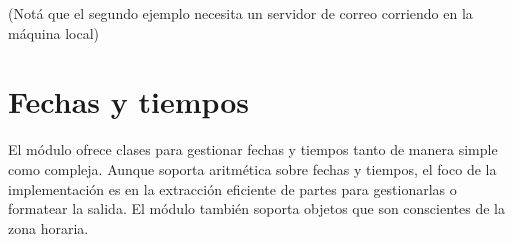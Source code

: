 \documentclass[a4,10pt,spanish]{sphinxmanual}
\begin{document}
\sphinxAtStartPar
(Notá que el segundo ejemplo necesita un servidor de correo corriendo en la máquina local)


\section{Fechas y tiempos}
\label{\detokenize{tutorial/stdlib:dates-and-times}}\label{\detokenize{tutorial/stdlib:tut-dates-and-times}}
\sphinxAtStartPar
El módulo  ofrece clases para gestionar fechas y tiempos tanto de manera simple como compleja.  Aunque soporta aritmética sobre fechas y tiempos, el foco de la implementación es en la extracción eficiente de partes para gestionarlas o formatear la salida.  El módulo también soporta objetos que son conscientes de la zona horaria.

\begin{sphinxVerbatim}[commandchars=\\\{\}]
   
  

    
    
\end{sphinxVerbatim}
\end{document}

